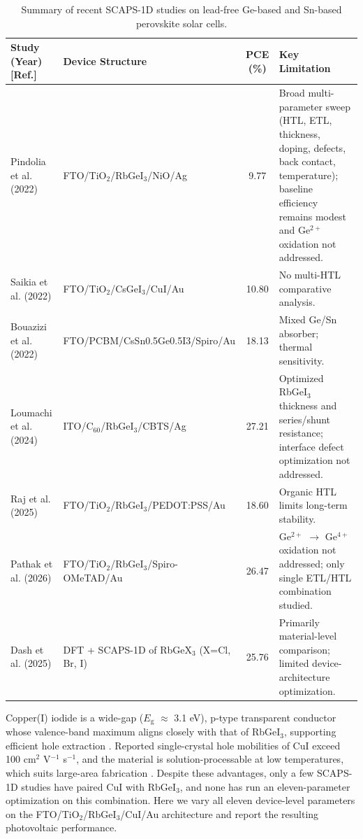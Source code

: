\documentclass[review]{elsarticle}
\begin{document}
\begin{table}[htbp]
\centering
{\small\setlength{\tabcolsep}{3pt}
\begin{tabularx}{\textwidth}{XXcX}
\hline
Study (Year) [Ref.] & Device Structure & PCE (\%) & Key Limitation
\\\hline
Pindolia et al. (2022) \cite{r14} & FTO/\allowbreak{}TiO$_{2}$/RbGeI$_{3}$/NiO/\allowbreak{}Ag & 9.77 & Broad multi-parameter sweep (HTL, ETL, thickness, doping, defects, back contact, temperature); baseline efficiency remains modest and Ge$^{2+}$ oxidation not addressed.\\
Saikia et al. (2022) \cite{r24} & FTO/\allowbreak{}TiO$_{2}$/CsGeI$_{3}$/CuI/\allowbreak{}Au & 10.80 & No multi-HTL comparative analysis.\\
Bouazizi et al. (2022) \cite{r15} & FTO/\allowbreak{}PCBM/\allowbreak{}CsSn0.5Ge0.5I3/\allowbreak{}Spiro/Au & 18.13 & Mixed Ge/Sn absorber; thermal sensitivity.\\
Loumachi et al. (2024) \cite{r22} & ITO/\allowbreak{}C$_{60}$/RbGeI$_{3}$/CBTS/\allowbreak{}Ag & 27.21 & Optimized RbGeI$_{3}$ thickness and series/shunt resistance; interface defect optimization not addressed.\\
Raj et al. (2025) \cite{r39} & FTO/\allowbreak{}TiO$_{2}$/RbGeI$_{3}$/PEDOT:PSS/\allowbreak{}Au & 18.60 & Organic HTL limits long-term stability.\\
Pathak et al. (2026) \cite{r23} & FTO/\allowbreak{}TiO$_{2}$/RbGeI$_{3}$/Spiro-OMeTAD/\allowbreak{}Au & 26.47 & Ge$^{2+}$ $\rightarrow$ Ge$^{4+}$ oxidation not addressed; only single ETL/HTL combination studied.\\
Dash et al. (2025) \cite{r17} & DFT + SCAPS-1D of RbGeX$_{3}$ (X=Cl, Br, I) & 25.76 & Primarily material-level comparison; limited device-architecture optimization.\\
\hline
\end{tabularx}
}
\caption{Summary of recent SCAPS-1D studies on lead-free Ge-based and Sn-based perovskite solar cells.}
\end{table}
Copper(I) iodide is a wide-gap ($E_{\mathrm{g}}$ $\approx$ 3.1 eV), p-type transparent conductor whose valence-band maximum aligns closely with that of RbGeI$_{3}$, supporting efficient hole extraction \cite{r25,r26}. Reported single-crystal hole mobilities of CuI exceed 100 cm$^{2}$ V$^{-1}$ s$^{-1}$, and the material is solution-processable at low temperatures, which suits large-area fabrication \cite{r27}. Despite these advantages, only a few SCAPS-1D studies have paired CuI with RbGeI$_{3}$, and none has run an eleven-parameter optimization on this combination. Here we vary all eleven device-level parameters on the FTO/\allowbreak{}TiO$_{2}$/RbGeI$_{3}$/CuI/\allowbreak{}Au architecture and report the resulting photovoltaic performance.
\end{document}
